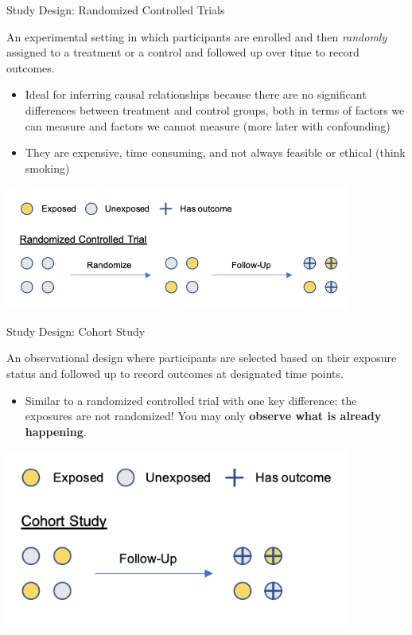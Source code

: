 \documentclass[ignorenonframetext,]{beamer}
\providecommand{\tightlist}{%
  \setlength{\itemsep}{0pt}\setlength{\parskip}{0pt}}
\begin{document}
\begin{frame}{Study Design: Randomized Controlled Trials}
\protect\hypertarget{study-design-randomized-controlled-trials}{}

An experimental setting in which participants are enrolled and then
\emph{randomly} assigned to a treatment or a control and followed up
over time to record outcomes.

\begin{itemize}
\tightlist
\item
  Ideal for inferring causal relationships because there are no
  significant differences between treatment and control groups, both in
  terms of factors we can measure and factors we cannot measure (more
  later with confounding)
\item
  They are expensive, time consuming, and not always feasible or ethical
  (think smoking)
\end{itemize}

\includegraphics[width=0.85\textwidth,height=\textheight]{../media/study-design-rct.png}

\end{frame}

\begin{frame}{Study Design: Cohort Study}
\protect\hypertarget{study-design-cohort-study}{}

An observational design where participants are selected based on their
exposure status and followed up to record outcomes at designated time
points.

\begin{itemize}
\tightlist
\item
  Similar to a randomized controlled trial with one key difference: the
  exposures are not randomized! You may only \textbf{observe what is
  already happening}.
\end{itemize}

\includegraphics[width=0.85\textwidth,height=\textheight]{../media/study-design-cohort.png}

\end{frame}
\end{document}

